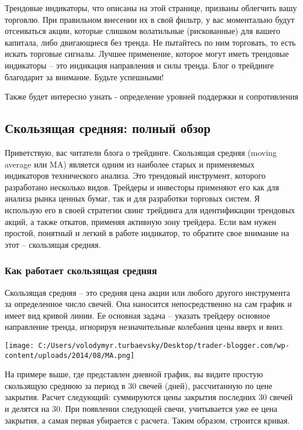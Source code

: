 \documentclass[a5paper]{article}
\begin{document}
Трендовые индикаторы, что описаны на этой странице, призваны облегчить вашу торговлю. При правильном внесении их в свой фильтр, у вас моментально будут отсеиваться акции, которые слишком волатильные (рискованные) для вашего капитала, либо двигающиеся без тренда. Не пытайтесь по ним торговать, то есть искать торговые сигналы. Лучшее применение, которое могут иметь трендовые индикаторы – это индикация направления и силы тренда. Блог о трейдинге благодарит за внимание. Будьте успешными!


Также будет интересно узнать - определение уровней поддержки и сопротивления


\subsection{Скользящая средняя: полный обзор}

Приветствую, вас читатели блога о трейдинге. Скользящая средняя (moving average или MA) является одним из наиболее старых и применяемых индикаторов технического анализа. Это трендовый инструмент, которого разработано несколько видов. Трейдеры и инвесторы применяют его как для анализа рынка ценных бумаг, так и для разработки торговых систем. Я использую его в своей стратегии свинг трейдинга для идентификации трендовых акций, а также откатов, применяя активную зону трейдера. Если вам нужен простой, понятный и легкий в работе индикатор, то обратите свое внимание на этот – скользящая средняя.

\subsubsection{Как работает скользящая средняя}

Скользящая средняя – это средняя цена акции или любого другого инструмента за определенное число свечей. Она наносится непосредственно на сам график и имеет вид кривой линии. Ее основная задача – указать трейдеру основное направление тренда, игнорируя незначительные колебания цены вверх и вниз.

\texttt{[image: C:/Users/volodymyr.turbaevsky/Desktop/trader-blogger.com/wp-content/uploads/2014/08/MA.png]}

На примере выше, где представлен дневной график, вы видите простую скользящую среднюю за период в 30 свечей (дней), рассчитанную по цене закрытия. Расчет следующий: суммируются цены закрытия последних 30 свечей и делятся на 30. При появлении следующей свечи, учитывается уже ее цена закрытия, а самая первая убирается с расчета. Таким образом, строится кривая.
\end{document}
